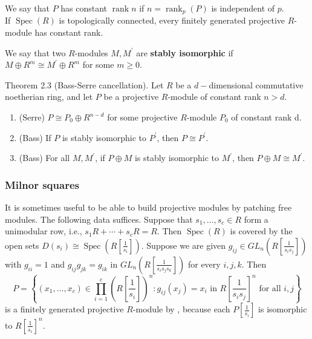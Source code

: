 We say that $P$ has constant $\operatorname{rank} n$ if $n=\operatorname{rank}_p(P)$ is independent of $p$. \\
If $\operatorname{Spec}(R)$ is topologically connected, every finitely generated projective $R$-module has constant rank.

We say that two $R$-modules $M, M^{\prime}$ are {\bfseries stably isomorphic} if $M \oplus R^m \cong M^{\prime} \oplus R^m$ for some $m \geq 0$.

\begin{theo}
    Theorem 2.3 (Bass-Serre cancellation). Let $R$ be a $d-$dimensional commutative noetherian ring, and let $P$ be a projective $R$-module of constant rank $n>d$.
    \begin{enumerate}
        \item (Serre) $P \cong P_0 \oplus R^{n-d}$ for some projective $R$-module $P_0$ of constant rank d.
        \item (Bass) If $P$ is stably isomorphic to $P^{\prime}$, then $P \cong P^{\prime}$.
        \item (Bass) For all $M, M^{\prime}$, if $P \oplus M$ is stably isomorphic to $M^{\prime}$, then $P \oplus M \cong M^{\prime}$.
    \end{enumerate} 
\end{theo}

\subsubsection{Milnor squares}

It is sometimes useful to be able to build projective modules by patching free modules. The following data suffices. Suppose that $s_1, \ldots, s_c \in R$ form a unimodular row, i.e., $s_1 R+\cdots+s_c R=R$. Then $\operatorname{Spec}(R)$ is covered by the open sets $D\left(s_i\right) \cong \operatorname{Spec}\left(R\left[\frac{1}{s_i}\right]\right)$. Suppose we are given $g_{i j} \in G L_n\left(R\left[\frac{1}{s_i s_j}\right]\right)$ with $g_{i i}=1$ and $g_{i j} g_{j k}=g_{i k}$ in $G L_n\left(R\left[\frac{1}{s_i s_j s_k}\right]\right)$ for every $i, j, k$. Then
$$
P=\left\{\left(x_1, \ldots, x_c\right) \in \prod_{i=1}^c\left(R\left[\frac{1}{s_i}\right]\right)^n: g_{i j}\left(x_j\right)=x_i \text { in } R\left[\frac{1}{s_i s_j}\right]^n \text { for all } i, j\right\}
$$
is a finitely generated projective $R$-module by , because each $P\left[\frac{1}{s_i}\right]$ is isomorphic to $R\left[\frac{1}{s_i}\right]^n$.\\

